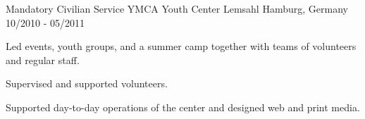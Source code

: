 \begin{cventries}
  \cventry
    {Mandatory Civilian Service} %
    {YMCA Youth Center Lemsahl} %
    {Hamburg, Germany} %
    {10/2010 - 05/2011} %
    {
      \begin{cvitems} %
        \item {Led events, youth groups, and a summer camp together with teams of volunteers and regular staff.} 
        \item {Supervised and supported volunteers.}
        \item{Supported day-to-day operations of the center and designed web and print media.}
      \end{cvitems}
    }

\end{cventries}
